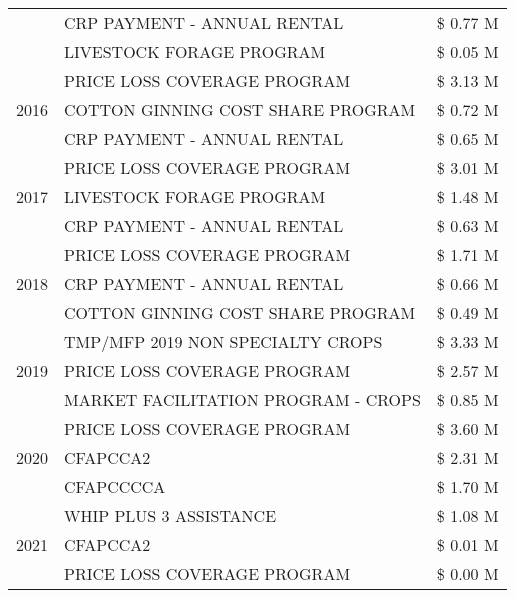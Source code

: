 \begin{tabular}{llr}
 & CRP PAYMENT - ANNUAL RENTAL & \$ 0.77 M \\
 & LIVESTOCK FORAGE PROGRAM & \$ 0.05 M \\
\cline{1-3}
\multirow[t]{3}{*}{2016} & PRICE LOSS COVERAGE PROGRAM                   & \$ 3.13 M \\
 & COTTON GINNING COST SHARE PROGRAM             & \$ 0.72 M \\
 & CRP PAYMENT - ANNUAL RENTAL                   & \$ 0.65 M \\
\cline{1-3}
\multirow[t]{3}{*}{2017} & PRICE LOSS COVERAGE PROGRAM & \$ 3.01 M \\
 & LIVESTOCK FORAGE PROGRAM & \$ 1.48 M \\
 & CRP PAYMENT - ANNUAL RENTAL & \$ 0.63 M \\
\cline{1-3}
\multirow[t]{3}{*}{2018} & PRICE LOSS COVERAGE PROGRAM & \$ 1.71 M \\
 & CRP PAYMENT - ANNUAL RENTAL & \$ 0.66 M \\
 & COTTON GINNING COST SHARE PROGRAM & \$ 0.49 M \\
\cline{1-3}
\multirow[t]{3}{*}{2019} & TMP/MFP 2019 NON SPECIALTY CROPS & \$ 3.33 M \\
 & PRICE LOSS COVERAGE PROGRAM & \$ 2.57 M \\
 & MARKET FACILITATION PROGRAM - CROPS & \$ 0.85 M \\
\cline{1-3}
\multirow[t]{3}{*}{2020} & PRICE LOSS COVERAGE PROGRAM & \$ 3.60 M \\
 & CFAPCCA2 & \$ 2.31 M \\
 & CFAPCCCCA & \$ 1.70 M \\
\cline{1-3}
\multirow[t]{3}{*}{2021} & WHIP PLUS 3 ASSISTANCE & \$ 1.08 M \\
 & CFAPCCA2 & \$ 0.01 M \\
 & PRICE LOSS COVERAGE PROGRAM & \$ 0.00 M \\
\cline{1-3}
\bottomrule
\end{tabular}
